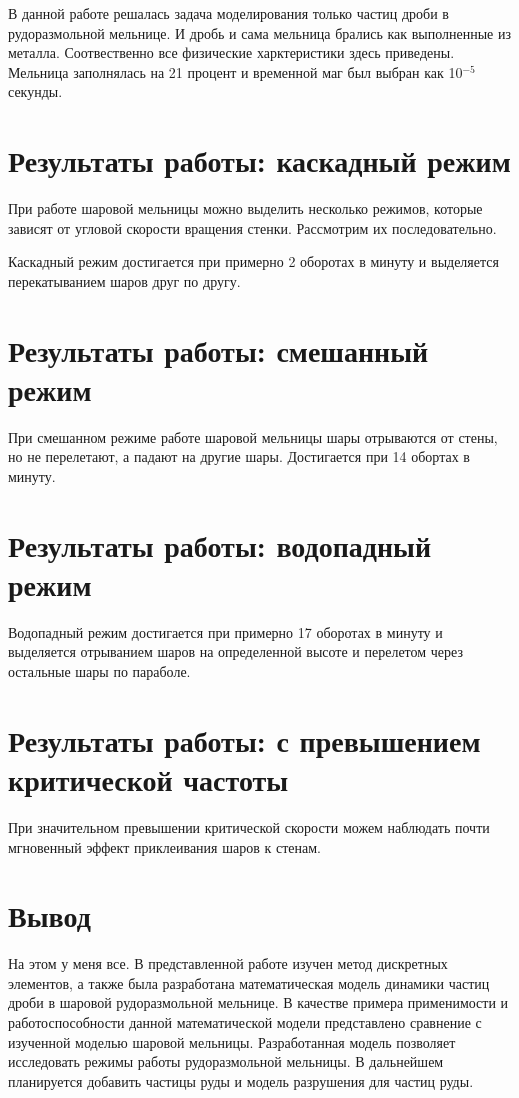 \documentclass[a4paper]{article}
\begin{document}
В данной работе решалась задача моделирования только частиц дроби в рудоразмольной мельнице.
И дробь и сама мельница брались как выполненные из металла.
Соотвественно все физические харктеристики здесь приведены.
Мельница заполнялась на 21 процент и временной маг был выбран как 10$^{-5}$ секунды.

\section{Результаты работы: каскадный режим}

При работе шаровой мельницы можно выделить несколько режимов, которые зависят от угловой скорости вращения стенки.
Рассмотрим их последовательно.

Каскадный режим достигается при примерно 2 оборотах в минуту и выделяется перекатыванием шаров друг по другу.

\section{Результаты работы: смешанный режим}

При смешанном режиме работе шаровой мельницы шары отрываются от стены, но не перелетают, а падают на другие шары. Достигается при 14 обортах в минуту.

\section{Результаты работы: водопадный режим}

Водопадный режим достигается при примерно 17 оборотах в минуту и выделяется отрыванием шаров на определенной высоте и перелетом через остальные шары по параболе.

\section{Результаты работы: с превышением критической частоты}

При значительном превышении критической скорости можем наблюдать почти мгновенный эффект приклеивания шаров к стенам.

\section{Вывод}

На этом у меня все.
В представленной работе изучен метод дискретных элементов, а также была разработана математическая модель динамики частиц дроби в шаровой рудоразмольной мельнице.
В качестве примера применимости и работоспособности данной математической модели представлено сравнение с изученной моделью шаровой мельницы.
Разработанная модель позволяет исследовать режимы работы рудоразмольной мельницы.
В дальнейшем планируется добавить частицы руды и модель разрушения для частиц руды.
\end{document}
